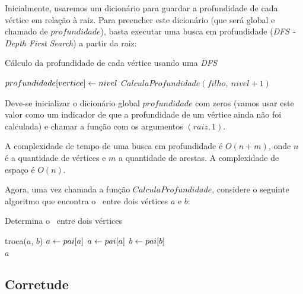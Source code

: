Inicialmente, usaremos um dicionário para guardar a profundidade de cada vértice em relação à raiz. Para preencher este dicionário (que será global e chamado de $profundidade$), basta executar uma busca em profundidade (\emph{DFS - Depth First Search}) a partir da raiz:

\vspace{0.2cm}

\begin{algorithm}[H]
\caption{Cálculo da profundidade de cada vértice usando uma \emph{DFS}}
\begin{algorithmic}[1]
    \State $profundidade[vertice] \leftarrow nivel$
        \State $CalculaProfundidade(filho,\ nivel+1)$
    \EndFor
\EndFunction
\end{algorithmic}
\end{algorithm}


Deve-se inicializar o dicionário global $profundidade$ com zeros (vamos usar este valor como um indicador de que a profundidade de um vértice ainda não foi calculada) e chamar a função com os argumentos $(raiz, 1)$.

A complexidade de tempo de uma busca em profundidade é $O(n+m)$, onde $n$ é a quantidade de vértices e $m$ a quantidade de arestas. A complexidade de espaço é $O(n)$.

Agora, uma vez chamada a função $CalculaProfundidade$, considere o seguinte algoritmo que encontra o \LCA\ entre dois vértices $a$ e $b$:

\vspace{0.2cm}

\begin{algorithm}[H]
\caption{Determina o \LCA\ entre dois vértices}
\begin{algorithmic}[1]
        \State troca($a$, $b$)
    \EndIf
        \State $a \leftarrow pai[a]$
    \EndWhile
        \State $a \leftarrow pai[a]$
        \State $b \leftarrow pai[b]$
    \EndWhile
    \\\hspace{5mm} \Return $a$
\EndFunction
\end{algorithmic}
\end{algorithm}


\subsection{Corretude}

